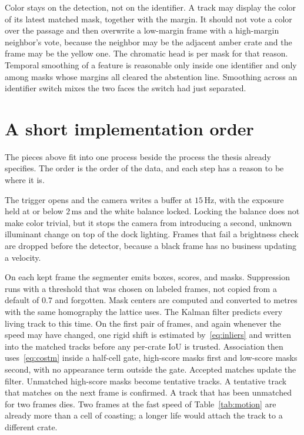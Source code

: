 \documentclass[11pt,a4paper]{article}
\begin{document}
Color stays on the detection, not on the identifier. A track may display the color of its latest matched mask, together with the margin. It should not vote a color over the passage and then overwrite a low-margin frame with a high-margin neighbor's vote, because the neighbor may be the adjacent amber crate and the frame may be the yellow one. The chromatic head is per mask for that reason. Temporal smoothing of a feature is reasonable only inside one identifier and only among masks whose margins all cleared the abstention line. Smoothing across an identifier switch mixes the two faces the switch had just separated.

\section{A short implementation order}

The pieces above fit into one process beside the process the thesis already specifies. The order is the order of the data, and each step has a reason to be where it is.

The trigger opens and the camera writes a buffer at $15\,\mathrm{Hz}$, with the exposure held at or below $2\,\mathrm{ms}$ and the white balance locked. Locking the balance does not make color trivial, but it stops the camera from introducing a second, unknown illuminant change on top of the dock lighting. Frames that fail a brightness check are dropped before the detector, because a black frame has no business updating a velocity.

On each kept frame the segmenter emits boxes, scores, and masks. Suppression runs with a threshold that was chosen on labeled frames, not copied from a default of $0.7$ and forgotten. Mask centers are computed and converted to metres with the same homography the lattice uses. The Kalman filter predicts every living track to this time. On the first pair of frames, and again whenever the speed may have changed, one rigid shift is estimated by~\eqref{eq:inliers} and written into the matched tracks before any per-crate IoU is trusted. Association then uses~\eqref{eq:costm} inside a half-cell gate, high-score masks first and low-score masks second, with no appearance term outside the gate. Accepted matches update the filter. Unmatched high-score masks become tentative tracks. A tentative track that matches on the next frame is confirmed. A track that has been unmatched for two frames dies. Two frames at the fast speed of Table~\ref{tab:motion} are already more than a cell of coasting; a longer life would attach the track to a different crate.
\end{document}
